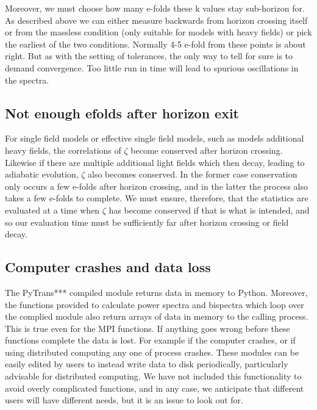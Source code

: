 \documentclass[10pt,
amsmath,amssymb,
aps,prd,nofootinbib,eqsecnum,a4paper]{revtex4}
\begin{document}
Moreover, we must choose how many e-folds these k values stay sub-horizon for. As described above we can either 
measure backwards from horizon crossing itself or from the massless condition (only suitable for models with heavy fields) or pick 
the earliest of the two conditions. 
Normally 4-5 e-fold from these points is about right. But as with the 
setting of tolerances, the only way to tell for sure is to demand convergence. Too little run in 
time will lead to spurious oscillations in the spectra.

\subsection{Not enough efolds after horizon exit}

For single field models or effective single field models, such as models additional heavy fields, the correlations of 
$\zeta$ become conserved after horizon crossing. Likewise if there are multiple additional light 
fields which then decay, leading to 
adiabatic evolution, $\zeta$ also becomes conserved. In the former case conservation only 
occurs a few e-folds after 
horizon crossing, and in the latter the process also takes a few e-folds to complete. 
We must ensure, therefore, that the statistics are 
evaluated at a time when $\zeta$ has become conserved if that is what is intended, and so our evaluation time 
must be sufficiently far after horizon crossing or field decay.

\subsection{Computer crashes and data loss}

The { PyTrans***} compiled module returns data in memory to Python. Moreover, the functions provided 
to calculate power spectra and bispectra which loop over the complied module also return 
arrays of data in memory to the calling process. This is true even for the MPI functions. If anything goes wrong before these functions complete the data is lost. For example if the computer crashes, or if using distributed computing any 
one of process crashes. These modules can be easily edited by users to instead write data to disk 
periodically, particularly advisable for distributed computing. We have not 
included this functionality to avoid overly complicated functions, and in any case, we anticipate that 
different users will have different needs, but it is an issue to look out for.
\end{document}
